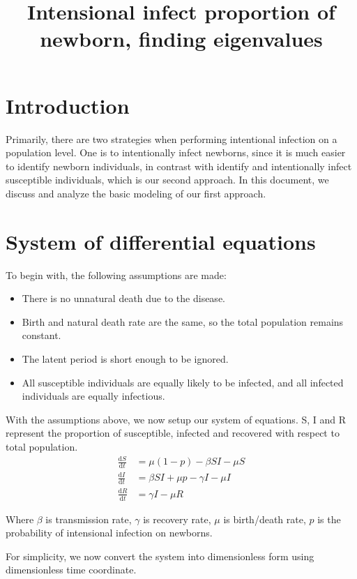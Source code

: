 \documentclass[12pt]{article}
\title{Intensional infect proportion of newborn, finding eigenvalues}
\newcommand\dbyd[2]{\frac{\mathrm d{#1}}{\mathrm d{#2}}}
\begin{document}
\maketitle

\section{Introduction}

Primarily, there are two strategies when performing intentional infection on a population level. One is to intentionally infect newborns, since it is much easier to identify newborn individuals, in contrast with identify and intentionally infect susceptible individuals, which is our second approach. In this document, we discuss and analyze the basic modeling of our first approach.

\section{System of differential equations}
To begin with, the following assumptions are made:
\begin{itemize}
\item There is no unnatural death due to the disease.
\item Birth and natural death rate are the same, so the total population remains constant.
\item The latent period is short enough to be ignored.
\item All susceptible individuals are equally likely to be infected, and all infected individuals are equally infectious.
\end{itemize}

With the assumptions above, we now setup our system of equations.
S, I and R represent the proportion of susceptible, infected and recovered with respect to total population.
\begin{equation}\label{1}
\begin{split}
\dbyd{S}{t}&=\mu(1-p)- \beta SI-\mu S \\
\dbyd{I}{t}&=\beta SI+\mu p-\gamma I -\mu I\\
\dbyd{R}{t}&=\gamma I-\mu R
\end{split}
\end{equation}

Where $\beta$ is transmission rate, $\gamma$ is recovery rate, $\mu$ is birth/death rate, $p$ is the probability of intensional infection on newborns.

For simplicity, we now convert the system into dimensionless form using dimensionless time coordinate. 
\end{document}
